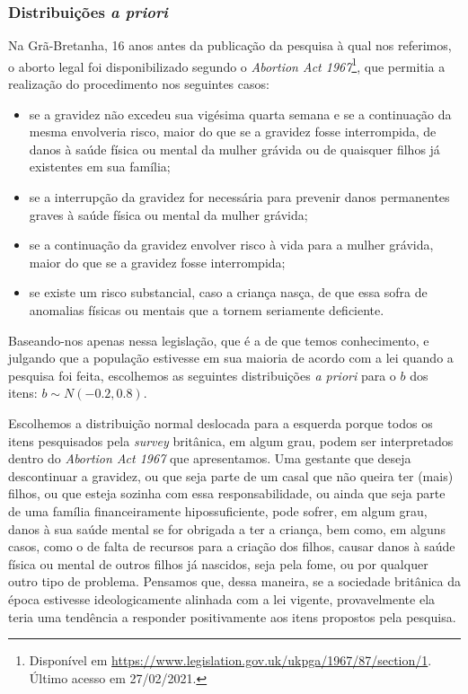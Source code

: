 \documentclass[
	12pt,				%
	openright,			%
	twoside,			%
	a4paper,			%
	english,			%
	brazil				%
	]{abntex2}
\begin{document}
 \subsubsection*{Distribuições \emph{a priori}}
 Na Grã-Bretanha, 16 anos antes da publicação da pesquisa à qual nos referimos, o aborto legal foi disponibilizado segundo o \emph{Abortion Act 1967}\footnote{Disponível em \url{https://www.legislation.gov.uk/ukpga/1967/87/section/1}. Último acesso em 27/02/2021.}, que permitia a realização do procedimento nos seguintes casos:
 \begin{itemize}
  \item se a gravidez não excedeu sua vigésima quarta semana e se a continuação da mesma envolveria risco, maior do que se a gravidez fosse interrompida, de danos à saúde física ou mental da mulher grávida ou de quaisquer filhos já existentes em sua família;
  \item se a interrupção da gravidez for necessária para prevenir danos permanentes graves à saúde física ou mental da mulher grávida;
  \item se a continuação da gravidez envolver risco à vida para a mulher grávida, maior do que se a gravidez fosse interrompida;
  \item se existe um risco substancial, caso a criança nasça, de que essa sofra de anomalias físicas ou mentais que a tornem seriamente deficiente.
 \end{itemize}
 
 Baseando-nos apenas nessa legislação, que é a de que temos conhecimento, e julgando que a população estivesse em sua maioria de acordo com a lei quando a pesquisa foi feita, escolhemos as seguintes distribuições \emph{a priori} para o $b$ dos itens: $b \sim N(-0.2, 0.8)$.
 
 Escolhemos a distribuição normal deslocada para a esquerda porque todos os itens pesquisados pela \emph{survey} britânica, em algum grau, podem ser interpretados dentro do \emph{Abortion Act 1967} que apresentamos. Uma gestante que deseja descontinuar a gravidez, ou que seja parte de um casal que não queira ter (mais) filhos, ou que esteja sozinha com essa responsabilidade, ou ainda que seja parte de uma família financeiramente hipossuficiente, pode sofrer, em algum grau, danos à sua saúde mental se for obrigada a ter a criança, bem como, em alguns casos, como o de falta de recursos para a criação dos filhos, causar danos à saúde física ou mental de outros filhos já nascidos, seja pela fome, ou por qualquer outro tipo de problema. Pensamos que, dessa maneira, se a sociedade britânica da época estivesse ideologicamente alinhada com a lei vigente, provavelmente ela teria uma tendência a responder positivamente aos itens propostos pela pesquisa.
\end{document}
